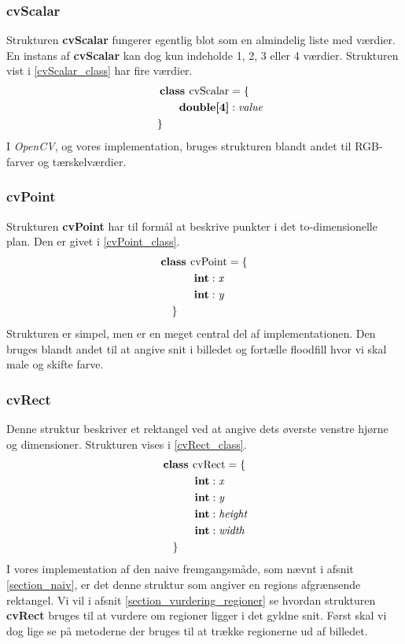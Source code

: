 {\subsubsection{cvScalar}
Strukturen \textbf{cvScalar} fungerer egentlig blot som en almindelig
liste med værdier. En instans af \textbf{cvScalar} kan dog kun indeholde
1, 2, 3 eller 4 værdier. Strukturen vist i \ref{cvScalar_class} har fire
værdier.
\begin{multline}
    \textbf{class~} \textrm{cvScalar} = \{ \\
    \shoveleft{\qquad\textbf{double[4]} : \textit{value}} \\
    \shoveleft{\}}\shoveright{}
    \label{cvScalar_class}
\end{multline}
I \emph{OpenCV}, og vores implementation, bruges strukturen blandt andet
til RGB-farver og tærskelværdier.

\subsubsection{cvPoint}
Strukturen \textbf{cvPoint} har til formål at beskrive punkter i det
to-dimensionelle plan. Den er givet i \ref{cvPoint_class}.
\begin{multline}
    \textbf{class~} \textrm{cvPoint} = \{ \\
    \shoveleft{\qquad\textbf{int} : \textit{x}} \\
    \shoveleft{\qquad\textbf{int} : \textit{y}} \\
    \shoveleft{\}}\shoveright{}
    \label{cvPoint_class}
\end{multline}
Strukturen er simpel, men er en meget central del af implementationen.
Den bruges blandt andet til at angive snit i billedet og fortælle
floodfill hvor vi skal male og skifte farve.

\subsubsection{cvRect}
Denne struktur beskriver et rektangel ved at angive dets øverste venstre
hjørne og dimensioner. Strukturen vises i \ref{cvRect_class}.
\begin{multline}
    \textbf{class~} \textrm{cvRect} = \{ \\
    \shoveleft{\qquad\textbf{int} : \textit{x}} \\
    \shoveleft{\qquad\textbf{int} : \textit{y}} \\
    \shoveleft{\qquad\textbf{int} : \textit{height}} \\
    \shoveleft{\qquad\textbf{int} : \textit{width}} \\
    \shoveleft{\}}\shoveright{}
    \label{cvRect_class}
\end{multline}
I vores implementation af den naive fremgangsmåde, som nævnt i afsnit
\ref{section_naiv}, er det denne struktur som angiver en regions
afgrænsende rektangel. Vi vil i afsnit \ref{section_vurdering_regioner}
se hvordan strukturen \textbf{cvRect} bruges til at vurdere om regioner
ligger i det gyldne snit. Først skal vi dog lige se på metoderne der
bruges til at trække regionerne ud af billedet.

}
